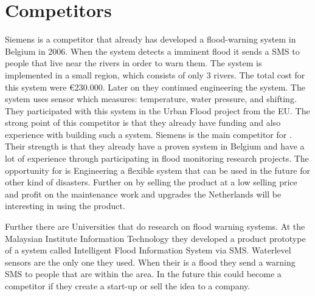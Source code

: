\section{Competitors}
Siemens is a competitor that already has developed a flood-warning system in Belgium in 2006. When the system detects a imminent flood it sends a SMS to people that live near the rivers in order to warn them. The system is implemented in a small region, which consists of only 3 rivers. The total cost for this system were \euro{}230.000. Later on they continued engineering the system. The system uses sensor which measures: temperature, water pressure, and shifting. They participated with this system in the Urban Flood project from the EU. The strong point of this competitor is that they already have funding and also experience with building such a system. Siemens is the main competitor for \CompanyName{}. Their strength is that they already have a proven system in Belgium and have a lot of experience through participating in flood monitoring research projects. The opportunity for \CompanyName{} is Engineering a flexible system that can be used in the future for other kind of disasters. Further on by selling the product at a low selling price and profit on the maintenance work and upgrades the Netherlands will be interesting in using the product.

Further there are Universities that do research on flood warning systems. At the Malaysian Institute Information Technology they developed a product prototype of a system called Intelligent Flood Information System via SMS. Waterlevel sensors are the only one they used. When their is a flood they send a warning SMS to people that are within the area. In the future this could become a competitor if they create a start-up or sell the idea to a company.  




